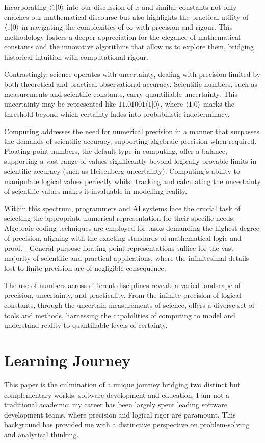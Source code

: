 \documentclass[12pt]{article}
\begin{document}
Incorporating \(\langle 1 | 0 \rangle\) into our discussion of \(\pi\) and similar constants not only enriches our mathematical discourse but also highlights the practical utility of \(\langle 1 | 0 \rangle\) in navigating the complexities of \(\infty\) with precision and rigour. This methodology fosters a deeper appreciation for the elegance of mathematical constants and the innovative algorithms that allow us to explore them, bridging historical intuition with computational rigour.

Contrastingly, science operates with uncertainty, dealing with precision limited by both theoretical and practical observational accuracy. Scientific numbers, such as measurements and scientific constants, carry quantifiable uncertainty. This uncertainty may be represented like \(11.01001\langle 1 | 0 \rangle\), where \(\langle 1 | 0 \rangle\) marks the threshold beyond which certainty fades into probabilistic indeterminacy.

Computing addresses the need for numerical precision in a manner that surpasses the demands of scientific accuracy, supporting algebraic precision when required. Floating-point numbers, the default type in computing, offer a balance, supporting a vast range of values significantly beyond logically provable limits in scientific accuracy (such as Heisenberg uncertainty). Computing's ability to manipulate logical values perfectly whilst tracking and calculating the uncertainty of scientific values makes it invaluable in modelling reality.

Within this spectrum, programmers and AI systems face the crucial task of selecting the appropriate numerical representation for their specific needs:
- Algebraic coding techniques are employed for tasks demanding the highest degree of precision, aligning with the exacting standards of mathematical logic and proof.
- General-purpose floating-point representations suffice for the vast majority of scientific and practical applications, where the infinitesimal details lost to finite precision are of negligible consequence.

The use of numbers across different disciplines reveals a varied landscape of precision, uncertainty, and practicality. From the infinite precision of logical constants, through the uncertain measurements of science, \iR{} offers a diverse set of tools and methods, harnessing the capabilities of computing to model and understand reality to quantifiable levels of certainty.

\section*{Learning Journey}
This paper is the culmination of a unique journey bridging two distinct but complementary worlds: software development and education. I am not a traditional academic; my career has been largely spent leading software development teams, where precision and logical rigor are paramount. This background has provided me with a distinctive perspective on problem-solving and analytical thinking.
\end{document}
